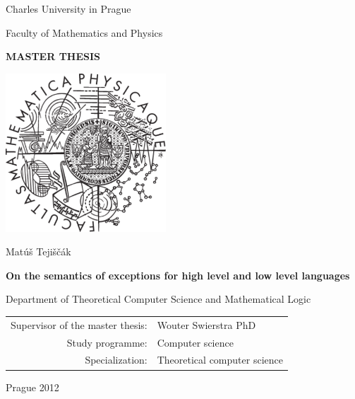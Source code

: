 \frontmatter



\pagestyle{empty}
\begin{center}

\large

Charles University in Prague

\medskip

Faculty of Mathematics and Physics

\vfill

{\bf\Large MASTER THESIS}

\vfill

\centerline{\mbox{\includegraphics[width=60mm]{figures/logo}}}

\vfill
\vspace{5mm}

{\LARGE Matúš Tejiščák}

\vspace{15mm}

{\LARGE\bfseries On the semantics of exceptions for high level and low level languages}

\vfill

Department of Theoretical Computer Science and Mathematical Logic

\vfill

\begin{tabular}{rl}

Supervisor of the master thesis: & Wouter Swierstra PhD\\
\noalign{\vspace{2mm}}
Study programme: & Computer science \\
\noalign{\vspace{2mm}}
Specialization: & Theoretical computer science \\
\end{tabular}

\vfill

Prague 2012

\end{center}


